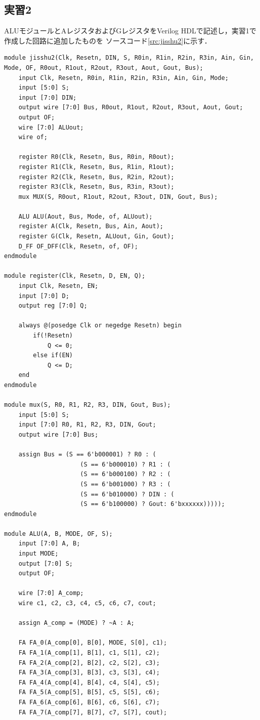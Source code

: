 \documentclass{jlreq}
\numberwithin{equation}{section}
\begin{document}
\subsection{実習2}
ALUモジュールとAレジスタおよびGレジスタをVerilog HDLで記述し，実習1で作成した回路に追加したものを
ソースコード\ref{src:jisshu2}に示す．
\begin{lstlisting}[caption={実習2のモジュール}, label={src:jisshu2}]
module jisshu2(Clk, Resetn, DIN, S, R0in, R1in, R2in, R3in, Ain, Gin, Mode, OF, R0out, R1out, R2out, R3out, Aout, Gout, Bus);
	input Clk, Resetn, R0in, R1in, R2in, R3in, Ain, Gin, Mode;
	input [5:0] S;
	input [7:0] DIN;
	output wire [7:0] Bus, R0out, R1out, R2out, R3out, Aout, Gout;
	output OF;
	wire [7:0] ALUout;
	wire of;
	
	register R0(Clk, Resetn, Bus, R0in, R0out);
	register R1(Clk, Resetn, Bus, R1in, R1out);
	register R2(Clk, Resetn, Bus, R2in, R2out);
	register R3(Clk, Resetn, Bus, R3in, R3out);
	mux MUX(S, R0out, R1out, R2out, R3out, DIN, Gout, Bus);
	
	ALU ALU(Aout, Bus, Mode, of, ALUout);
	register A(Clk, Resetn, Bus, Ain, Aout);
	register G(Clk, Resetn, ALUout, Gin, Gout);
	D_FF OF_DFF(Clk, Resetn, of, OF);
endmodule

module register(Clk, Resetn, D, EN, Q);
	input Clk, Resetn, EN;
	input [7:0] D;
	output reg [7:0] Q;
	
	always @(posedge Clk or negedge Resetn) begin
		if(!Resetn)
			Q <= 0;
		else if(EN)
			Q <= D;
	end
endmodule

module mux(S, R0, R1, R2, R3, DIN, Gout, Bus);
	input [5:0] S;
	input [7:0] R0, R1, R2, R3, DIN, Gout;
	output wire [7:0] Bus;
	
	assign Bus = (S == 6'b000001) ? R0 : (
					 (S == 6'b000010) ? R1 : (
					 (S == 6'b000100) ? R2 : (
					 (S == 6'b001000) ? R3 : (
					 (S == 6'b010000) ? DIN : (
					 (S == 6'b100000) ? Gout: 6'bxxxxxx)))));
endmodule

module ALU(A, B, MODE, OF, S);
	input [7:0] A, B;
	input MODE;
	output [7:0] S;
	output OF;
	
	wire [7:0] A_comp;
	wire c1, c2, c3, c4, c5, c6, c7, cout;
	
	assign A_comp = (MODE) ? ~A : A;
	
	FA FA_0(A_comp[0], B[0], MODE, S[0], c1);
	FA FA_1(A_comp[1], B[1], c1, S[1], c2);
	FA FA_2(A_comp[2], B[2], c2, S[2], c3);
	FA FA_3(A_comp[3], B[3], c3, S[3], c4);
	FA FA_4(A_comp[4], B[4], c4, S[4], c5);
	FA FA_5(A_comp[5], B[5], c5, S[5], c6);
	FA FA_6(A_comp[6], B[6], c6, S[6], c7);
	FA FA_7(A_comp[7], B[7], c7, S[7], cout);
	

\end{lstlisting}
\end{document}
